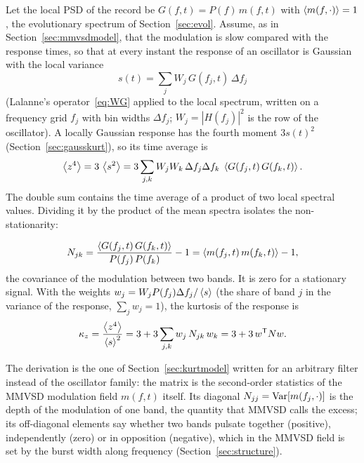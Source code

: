 Let the local PSD of the record be $G(f,t) = P(f)\,m(f,t)$ with $\left\langle m(f,\cdot) \right\rangle = 1$, the
evolutionary spectrum of Section~\ref{sec:evol}. Assume, as in Section~\ref{sec:mmvsdmodel}, that the
modulation is slow compared with the response times, so that at every instant the response of an
oscillator is Gaussian with the local variance
\begin{equation}
  s(t) = \sum_j W_j\,G(f_j,t)\,\Delta f_j
\end{equation}
(Lalanne's operator~\eqref{eq:WG} applied to the local spectrum, written on a frequency grid $f_j$ with
bin widths $\Delta f_j$; $W_j = |H(f_j)|^2$ is the row of the oscillator). A locally Gaussian response
has the fourth moment $3s(t)^2$ (Section~\ref{sec:gausskurt}), so its time average is
\begin{equation}
  \left\langle z^4 \right\rangle = 3\,\left\langle s^2 \right\rangle = 3\sum_{j,k} W_jW_k\,\Delta f_j\Delta f_k\;\left\langle G(f_j,t)\,G(f_k,t) \right\rangle .
\end{equation}
The double sum contains the time average of a product of two local spectral values. Dividing it by the
product of the mean spectra isolates the non-stationarity:
\begin{result}
\begin{equation}\label{eq:nsm}
  N_{jk} = \frac{\left\langle G(f_j,t)\,G(f_k,t) \right\rangle}{P(f_j)\,P(f_k)} - 1 = \left\langle m(f_j,t)\,m(f_k,t) \right\rangle - 1 ,
\end{equation}
the covariance of the modulation between two bands. It is zero for a stationary signal. With the
weights $w_j = W_jP(f_j)\Delta f_j/\left\langle s \right\rangle$ (the share of band $j$ in the variance of the response,
$\sum_j w_j = 1$), the kurtosis of the response is
\begin{equation}\label{eq:kznsm}
  \kappa_z = \frac{\left\langle z^4 \right\rangle}{\left\langle s \right\rangle^2} = 3 + 3\sum_{j,k} w_j\,N_{jk}\,w_k = 3 + 3\,w^{\mathsf T}Nw .
\end{equation}
\end{result}
The derivation is the one of Section~\ref{sec:kurtmodel} written for an arbitrary filter instead of
the oscillator family: the matrix is the second-order statistics of the MMVSD modulation field
$m(f,t)$ itself. Its diagonal $N_{jj} = \operatorname{Var}[m(f_j,\cdot)]$ is the depth of the modulation of one band,
the quantity that MMVSD calls the excess; its off-diagonal elements say whether two bands pulsate
together (positive), independently (zero) or in opposition (negative), which in the MMVSD field is
set by the burst width along frequency (Section~\ref{sec:structure}).

